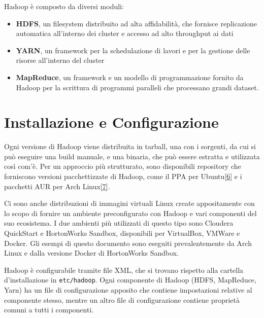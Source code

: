 \documentclass[italian,a4paper, twoside, 12pt]{report}
\begin{document}
Hadoop è composto da diversi moduli:

\begin{itemize}
\item
  \textbf{HDFS}, un filesystem distribuito ad alta affidabilità, che
  fornisce replicazione automatica all'interno dei cluster e accesso ad
  alto throughput ai dati
\item
  \textbf{YARN}, un framework per la schedulazione di lavori e per la
  gestione delle risorse all'interno del cluster
\item
  \textbf{MapReduce}, un framework e un modello di programmazione
  fornito da Hadoop per la scrittura di programmi paralleli che
  processano grandi dataset.
\end{itemize}

\section{Installazione e
Configurazione}\label{installazione-e-configurazione}

Ogni versione di Hadoop viene distribuita in tarball, una con i
sorgenti, da cui si può eseguire una build manuale, e una binaria, che
può essere estratta e utilizzata così com'è. Per un approccio più
strutturato, sono disponibili repository che forniscono versioni
pacchettizzate di Hadoop, come il PPA per
Ubuntu{[}\protect\hyperlink{ref-hadoop-ppa}{6}{]} e i pacchetti AUR per
Arch Linux{[}\protect\hyperlink{ref-hadoop-aur}{7}{]}.

Ci sono anche distribuzioni di immagini virtuali Linux create
appositamente con lo scopo di fornire un ambiente preconfigurato con
Hadoop e vari componenti del suo ecosistema. I due ambienti più
utilizzati di questo tipo sono Cloudera QuickStart e HortonWorks
Sandbox, disponibili per VirtualBox, VMWare e Docker. Gli esempi di
questo documento sono eseguiti prevalentemente da Arch Linux e dalla
versione Docker di HortonWorks Sandbox.

Hadoop è configurabile tramite file XML, che si trovano rispetto alla
cartella d'installazione in \texttt{etc/hadoop}. Ogni componente di
Hadoop (HDFS, MapReduce, Yarn) ha un file di configurazione apposito che
contiene impostazioni relative al componente stesso, mentre un altro
file di configurazione contiene proprietà comuni a tutti i componenti.
\end{document}
